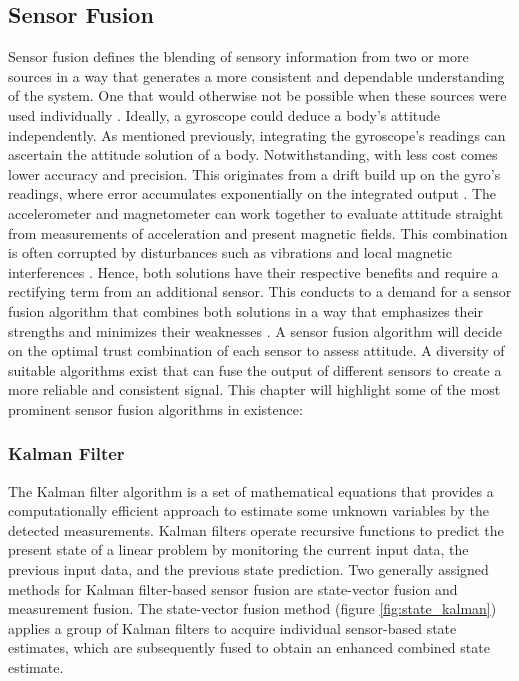 \subsection{Sensor Fusion}
\label{sub:sensor_fusion}

Sensor fusion defines the blending of sensory information from two or more sources in a way that generates a more consistent and dependable understanding of the system. One that would otherwise not be possible when these sources were used individually \cite{bostrom2007definition}. Ideally, a gyroscope could deduce a body's attitude independently. As mentioned previously, integrating the gyroscope's readings can ascertain the attitude solution of a body. Notwithstanding, with less cost comes lower accuracy and precision. This originates from a drift build up on the gyro's readings, where error accumulates exponentially on the integrated output \cite{borenstein2009heuristic}. The accelerometer and magnetometer can work together to evaluate attitude straight from measurements of acceleration and present magnetic fields. This combination is often corrupted by disturbances such as vibrations and local magnetic interferences \cite{silva2021error}. Hence, both solutions have their respective benefits and require a rectifying term from an additional sensor. This conducts to a demand for a sensor fusion algorithm that combines both solutions in a way that emphasizes their strengths and minimizes their weaknesses \cite{hol2011sensor}. A sensor fusion algorithm will decide on the optimal trust combination of each sensor to assess attitude. A diversity of suitable algorithms exist that can fuse the output of different sensors to create a more reliable and consistent signal. This chapter will highlight some of the most prominent sensor fusion algorithms in existence:

\subsubsection{Kalman Filter}

The Kalman filter algorithm is a set of mathematical equations that provides a computationally efficient approach to estimate some unknown variables by the detected measurements\cite{welch1995introduction}. Kalman filters operate recursive functions to predict the present state of a linear problem by monitoring the current input data, the previous input data, and the previous state prediction. Two generally assigned methods for Kalman filter-based sensor fusion are state-vector fusion and measurement fusion. The state-vector fusion method (figure \ref{fig:state_kalman}) applies a group of Kalman filters to acquire individual sensor-based state estimates, which are subsequently fused to obtain an enhanced combined state estimate.

